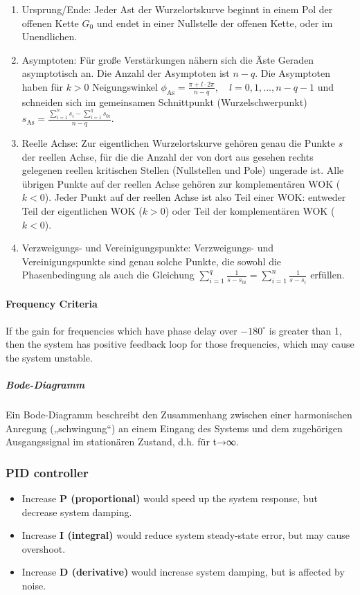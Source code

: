 \begin{enumerate}
  \item Ursprung/Ende: Jeder Ast der Wurzelortskurve beginnt in einem Pol der offenen Kette $G_0$ und endet in einer Nullstelle der offenen Kette, oder im Unendlichen.
  \item Asymptoten: Für große Verstärkungen nähern sich die Äste Geraden asymptotisch an. Die Anzahl der Asymptoten ist $n-q$. Die Asymptoten haben für $k>0$ Neigungswinkel $\phi_\mathrm{As} = \frac{\pi+ l \cdot 2 \pi}{n-q}, \quad l=0,1,...,n-q-1$ und schneiden sich im gemeinsamen Schnittpunkt (Wurzelschwerpunkt) $s_\mathrm{As} = \frac{\sum_{i=1}^{n}s_i-\sum_{i=1}^{q}s_{0i}}{n-q}$.
  \item Reelle Achse: Zur eigentlichen Wurzelortskurve gehören genau die Punkte $s$ der reellen Achse, für die die Anzahl der von dort aus gesehen rechts gelegenen reellen kritischen Stellen (Nullstellen und Pole) ungerade ist. Alle übrigen Punkte auf der reellen Achse gehören zur komplementären WOK ($k<0$). Jeder Punkt auf der reellen Achse ist also Teil einer WOK: entweder Teil der eigentlichen WOK ($k>0$) oder Teil der komplementären WOK ($k<0$).
  \item Verzweigungs- und Vereinigungspunkte: Verzweigungs- und Vereinigungspunkte sind genau solche Punkte, die sowohl die Phasenbedingung als auch die Gleichung $\sum_{i=1}^{q} \frac{1}{s-s_{0i}} = \sum_{i=1}^{n}\frac{1}{s-s_i}$ erfüllen.
\end{enumerate}


\paragraph{Frequency Criteria} If the gain for frequencies which have phase delay over $-180^\circ$ is greater than 1, then the system has positive feedback loop for those frequencies, which may cause the system unstable.

\subparagraph{Bode-Diagramm} Ein Bode-Diagramm beschreibt den Zusammenhang zwischen einer harmonischen Anregung („schwingung“) an einem Eingang des Systems und dem zugehörigen Ausgangssignal im stationären Zustand, d.h. für t→∞.

\subsubsection{PID controller}
\begin{itemize}
  \item Increase \textbf{P (proportional)} would speed up the system response, but decrease system damping.
  \item Increase \textbf{I (integral)} would reduce system steady-state error, but may cause overshoot.
  \item Increase \textbf{D (derivative)} would increase system damping, but is affected by noise.
\end{itemize}

